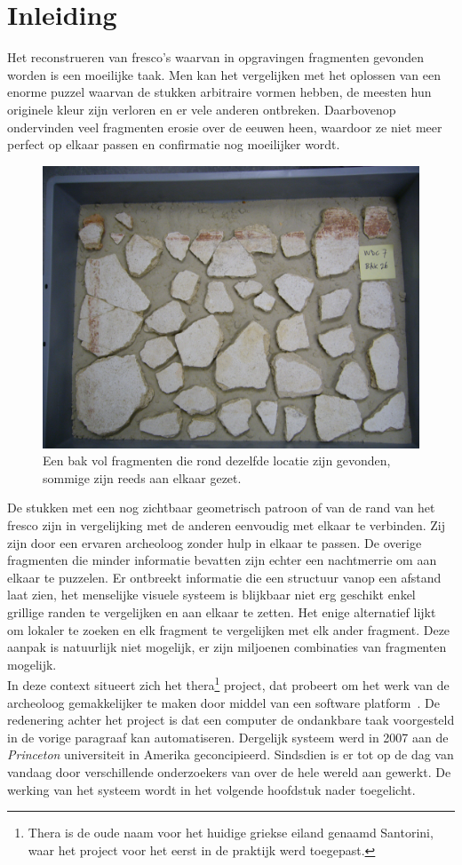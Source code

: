 \chapter{Inleiding}
\label{inleiding}
Het reconstrueren van fresco's waarvan in opgravingen fragmenten gevonden worden is een moeilijke taak. Men kan het vergelijken met het oplossen van een enorme puzzel waarvan de stukken arbitraire vormen hebben, de meesten hun originele kleur zijn verloren en er vele anderen ontbreken. Daarbovenop ondervinden veel fragmenten erosie over de eeuwen heen, waardoor ze niet meer perfect op elkaar passen en confirmatie nog moeilijker wordt.\\

\begin{figure}[ht]
	\begin{center}
		\includegraphics[width=0.6\columnwidth]{images/WDC7_26.JPG}
		\caption{Een bak vol fragmenten die rond dezelfde locatie zijn gevonden, sommige zijn reeds aan elkaar gezet.}
		\label{fig:bakinleiding}
	\end{center}
\end{figure}

De stukken met een nog zichtbaar geometrisch patroon of van de rand van het fresco zijn in vergelijking met de anderen eenvoudig met elkaar te verbinden. Zij zijn door een ervaren archeoloog zonder hulp in elkaar te passen. De overige fragmenten die minder informatie bevatten zijn echter een nachtmerrie om aan elkaar te puzzelen. Er ontbreekt informatie die een structuur vanop een afstand laat zien, het menselijke visuele systeem is blijkbaar niet erg geschikt enkel grillige randen te vergelijken en aan elkaar te zetten. Het enige alternatief lijkt om lokaler te zoeken en elk fragment te vergelijken met elk ander fragment. Deze aanpak is natuurlijk niet mogelijk, er zijn miljoenen combinaties van fragmenten mogelijk.\\

In deze context situeert zich het thera\footnote{Thera is de oude naam voor het huidige griekse eiland genaamd Santorini, waar het project voor het eerst in de praktijk werd toegepast.} project, dat probeert om het werk van de archeoloog gemakkelijker te maken door middel van een software platform~\cite{Brown2008}. De
redenering achter het project is dat een computer de ondankbare taak voorgesteld in de vorige paragraaf kan automatiseren. Dergelijk systeem werd in 2007 aan de \emph{Princeton} universiteit in Amerika geconcipieerd. Sindsdien is er tot op de dag van vandaag door verschillende onderzoekers van over de hele wereld aan gewerkt. De werking van het systeem wordt in het volgende hoofdstuk nader toegelicht.\\

